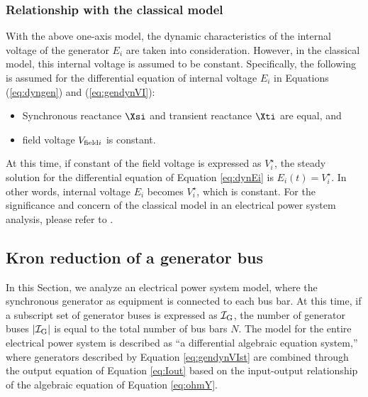 \documentclass[graybox, envcountchap]{svmult}
\begin{document}
\smallskip
\subsubsection{Relationship with the classical model}

With the above one-axis model, the dynamic characteristics of the internal voltage of the generator $E_i$ are taken into consideration. However, in the classical model, this internal voltage is assumed to be constant.
Specifically, the following is assumed for the differential equation of internal voltage $E_i$ in Equations (\ref{eq:dyngen}) and (\ref{eq:gendynVI}):
\begin{itemize}
	\item Synchronous reactance $\Xsi$ and transient reactance $\Xti$ are equal, and
	\item field voltage $V_{{\rm field}i}$ is constant.
\end{itemize}
At this time, if constant of the field voltage is expressed as $V_i^{\star}$, the steady solution for the differential equation of Equation \ref{eq:dynEi} is $E_i(t)=V_i^{\star}$.
In other words, internal voltage $E_i$ becomes $V_i^{\star}$, which is constant.
For the significance and concern of the classical model in an electrical power system analysis, please refer to \cite[Section 2.11]{anderson2008power}.


\subsection{Kron reduction of a generator bus}\label{sec:allgen}

In this Section, we analyze an electrical power system model, where the synchronous generator as equipment is connected to each bus bar. 
At this time, if a subscript set of generator buses is expressed as $\mathcal{I}_{\rm G}$, the number of generator buses $|\mathcal{I}_{\rm G}|$ is equal to the total number of bus bars $N$.
The model for the entire electrical power system is described as “a differential algebraic equation system,” where generators described by Equation \ref{eq:gendynVIst} are combined through the output equation of Equation \ref{eq:Iout} based on the input-output relationship of the algebraic equation of Equation \ref{eq:ohmY}.
 
\end{document}
